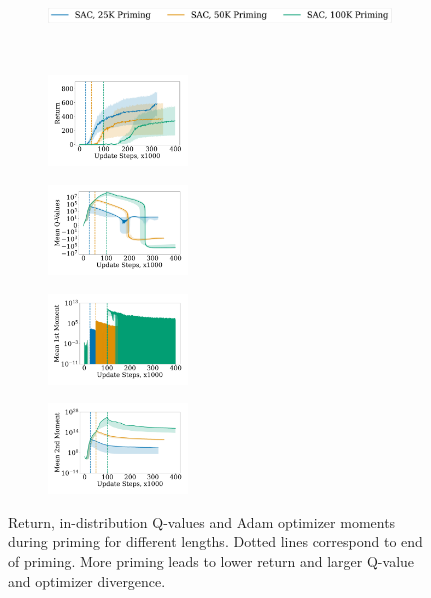\begin{figure}[t!]
\centering
    \begin{subfigure}[b]{0.8\textwidth}
        \centering
        \includegraphics[height=0.4cm]{figures/dissecting/priming/priming_base_return_legend.pdf}
    \end{subfigure}\\%
    \begin{subfigure}[b]{0.25\textwidth}
        \centering
        \includegraphics[width=3.7cm, trim=1cm 1cm 1cm 1cm ,clip]{figures/dissecting/priming/priming_base_return.pdf}
        \label{subfig:overestimation:overestimation:priming_base_ret}
    \end{subfigure}%
    \begin{subfigure}[b]{0.25\textwidth}
    \centering
        \includegraphics[width=3.7cm, trim=1cm 1cm 1cm 1cm ,clip]{figures/dissecting/priming/priming_base_Q.pdf}
        \label{subfig:overestimation:overestimation:priming_base_Q}
    \end{subfigure}%
    \begin{subfigure}[b]{0.25\textwidth}
        \centering
        \includegraphics[width=3.7cm, trim=1cm 1cm 1cm 1cm ,clip]{figures/dissecting/priming/priming_base_exp_avg.pdf}
    \end{subfigure}%
    \begin{subfigure}[b]{0.25\textwidth}
        \centering
        \includegraphics[width=3.7cm, trim=1cm 1cm 1cm 1cm ,clip]{figures/dissecting/priming/priming_base_exp_avg_sq.pdf}
    \end{subfigure}%
    \caption{Return, in-distribution Q-values and Adam optimizer moments during priming for different lengths. Dotted lines correspond to end of priming. More priming leads to lower return and larger Q-value and optimizer divergence.}
    \label{fig:overestimationpriming_base}
\end{figure}

